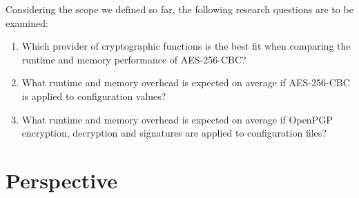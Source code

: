 Considering the scope we defined so far, the following research questions are to be examined:

\begin{enumerate}
  \item Which provider of cryptographic functions is the best fit when comparing the runtime and memory performance of AES-256-CBC?
  \item What runtime and memory overhead is expected on average if AES-256-CBC is applied to configuration values?
  \item What runtime and memory overhead is expected on average if OpenPGP encryption, decryption and signatures are applied to configuration files?
\end{enumerate}

\section{Perspective}

